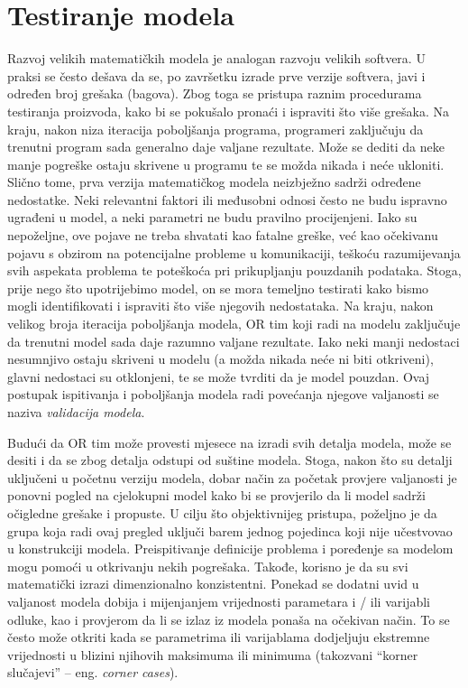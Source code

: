 \documentclass[a4paper, utf8, 11pt, colorlinks]{book}
\begin{document}


\section{Testiranje modela}
Razvoj velikih matematičkih modela je analogan razvoju velikih softvera. U praksi se često dešava da se, po završetku izrade prve verzije softvera, javi i određen broj grešaka (bagova). Zbog toga se pristupa raznim procedurama testiranja proizvoda, kako bi se pokušalo pronaći i
ispraviti što više grešaka. Na kraju, nakon niza iteracija poboljšanja programa, programeri zaključuju da trenutni program sada generalno
daje  valjane rezultate. Može se dediti da neke manje pogreške ostaju skrivene u programu te se možda   nikada i neće ukloniti. Slično tome, prva verzija matematičkog modela neizbježno sadrži određene
nedostatke. Neki relevantni faktori ili međusobni odnosi često ne budu  ispravno ugrađeni
u model, a neki parametri ne budu pravilno procijenjeni. Iako su nepoželjne, ove pojave ne treba shvatati kao fatalne greške, već kao očekivanu pojavu s obzirom na potencijalne probleme u komunikaciji, teškoću razumijevanja svih aspekata problema te poteškoća pri prikupljanju pouzdanih podataka. Stoga, prije nego što upotrijebimo model, on se mora  temeljno testirati kako bismo mogli  identifikovati 
i ispraviti što više njegovih nedostataka. Na kraju, nakon velikog broja iteracija poboljšanja 
modela, OR tim koji radi na modelu zaključuje da trenutni model sada daje razumno valjane rezultate.  Iako neki manji nedostaci nesumnjivo ostaju skriveni u modelu (a možda nikada neće ni biti otkriveni), glavni nedostaci su otklonjeni, te se može tvrditi da je model pouzdan. Ovaj postupak ispitivanja i poboljšanja modela radi povećanja njegove valjanosti se naziva \emph{validacija modela}. 

Budući da OR tim može provesti mjesece na izradi svih detalja modela, može se desiti i da se zbog detalja odstupi od suštine modela. Stoga, nakon što su detalji uključeni u 
početnu verziju modela, dobar način za početak provjere valjanosti je ponovni pogled na cjelokupni model kako bi se provjerilo da li model sadrži  očigledne grešake i propuste. U cilju što objektivnijeg pristupa, poželjno je da grupa koja radi ovaj pregled uključi barem jednog pojedinca koji nije učestvovao u konstrukciji modela. Preispitivanje definicije
problema i poređenje sa modelom mogu pomoći u otkrivanju nekih pogrešaka. Takođe, korisno je da su svi matematički izrazi dimenzionalno konzistentni.  Ponekad se  dodatni uvid u valjanost modela dobija i 
mijenjanjem vrijednosti parametara i / ili varijabli odluke, kao i provjerom da li se  izlaz iz modela ponaša na očekivan način. To se često može otkriti kada se parametrima ili varijablama dodjeljuju ekstremne vrijednosti u blizini njihovih maksimuma ili minimuma (takozvani ``korner slučajevi'' -- eng. \textit{corner cases}). 
\end{document}
